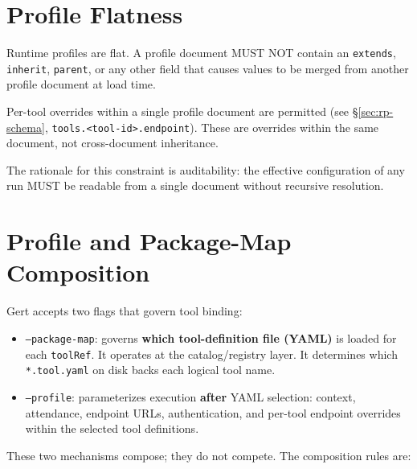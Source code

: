 \section{Profile Flatness}
\label{sec:rp-flatness}

Runtime profiles are flat.  A profile document MUST NOT contain an
\texttt{extends}, \texttt{inherit}, \texttt{parent}, or any other field that
causes values to be merged from another profile document at load time.

Per-tool overrides within a single profile document are permitted (see
\S\ref{sec:rp-schema}, \texttt{tools.<tool-id>.endpoint}).  These are
overrides within the same document, not cross-document inheritance.

The rationale for this constraint is auditability: the effective configuration
of any run MUST be readable from a single document without recursive
resolution.

\section{Profile and Package-Map Composition}
\label{sec:rp-composition}

Gert accepts two flags that govern tool binding:

\begin{itemize}[noitemsep]
  \item \texttt{--package-map}: governs \textbf{which tool-definition file
        (YAML)} is loaded for each \texttt{toolRef}.  It operates at the
        catalog/registry layer.  It determines which
        \texttt{*.tool.yaml} on disk backs each logical tool name.
  \item \texttt{--profile}: parameterizes execution \textbf{after} YAML
        selection: context, attendance, endpoint URLs, authentication, and
        per-tool endpoint overrides within the selected tool definitions.
\end{itemize}

These two mechanisms compose; they do not compete.  The composition rules are:

